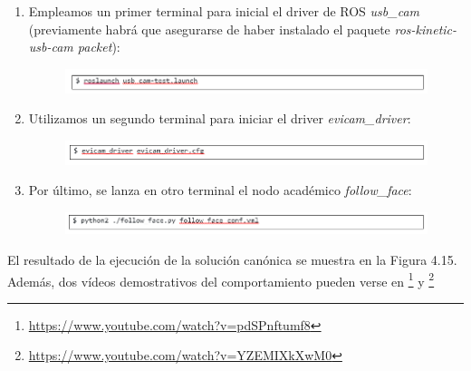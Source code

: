 \begin{enumerate}
	\item Empleamos un primer terminal para inicial el driver de ROS \textit{usb\_cam} (previamente habrá que asegurarse de haber instalado el paquete \textit{ros-kinetic-usb-cam packet}):
	\begin{figure}[H]
		\begin{center}
			\includegraphics[width=0.95\linewidth]{figures/ffcomando1.png}
			\label{fig.ffcomando1}
		\end{center}
	\end{figure}
	\item Utilizamos un segundo terminal para iniciar el driver \textit{evicam\_driver}:
	\begin{figure}[H]
		\begin{center}
			\includegraphics[width=0.95\linewidth]{figures/ffcomando2.png}
			\label{fig.ffcomando2}
		\end{center}
	\end{figure}
	\item Por último, se lanza en otro terminal el nodo académico \textit{follow\_face}:
	\begin{figure}[H]
		\begin{center}
			\includegraphics[width=0.95\linewidth]{figures/ffcomando3.png}
			\label{fig.ffcomando3}
		\end{center}
	\end{figure}
\end{enumerate}

El resultado de la ejecución de la solución canónica se muestra en la Figura 4.15. Además, dos vídeos demostrativos del comportamiento pueden verse en \footnote{\url{https://www.youtube.com/watch?v=pdSPnftumf8}} y \footnote{\url{https://www.youtube.com/watch?v=YZEMIXkXwM0}}

